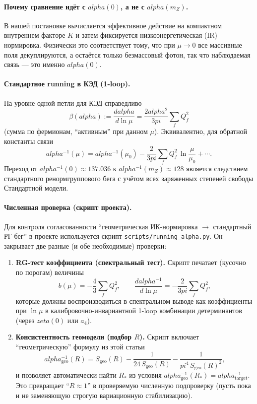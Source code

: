 \documentclass[12pt]{article}
\def\alpha{alpha}%
\def\pi{pi}%
\def\zeta{zeta}%
\begin{document}
\paragraph{Почему сравнение идёт с $\alpha(0)$, а не с $\alpha(m_Z)$.}
В нашей постановке вычисляется эффективное действие на компактном внутреннем факторе $K$ и затем фиксируется низкоэнергетическая (IR) нормировка.
Физически это соответствует тому, что при $\mu\to 0$ все массивные поля декуплируются, а остаётся только безмассовый фотон, так что наблюдаемая связь --- это именно $\alpha(0)$.

\paragraph{Стандартное running в КЭД (1-loop).}
На уровне одной петли для КЭД справедливо
\begin{equation}
\beta(\alpha):=\frac{d\alpha}{d\ln\mu}=\frac{2\alpha^2}{3\pi}\sum_f Q_f^2
\end{equation}
(сумма по фермионам, ``активным'' при данном $\mu$).
Эквивалентно, для обратной константы связи
\begin{equation}
\alpha^{-1}(\mu)=\alpha^{-1}(\mu_0)-\frac{2}{3\pi}\sum_f Q_f^2\,\ln\frac{\mu}{\mu_0}+\cdots.
\end{equation}
Переход от $\alpha^{-1}(0)\approx 137.036$ к $\alpha^{-1}(m_Z)\approx 128$ является следствием стандартного ренормгруппового бега с учётом всех заряженных степеней свободы Стандартной модели.

\paragraph{Численная проверка (скрипт проекта).}
Для контроля согласованности ``геометрическая ИК-нормировка $\to$ стандартный РГ-бег'' в проекте используется скрипт \texttt{scripts/running\_alpha.py}.
Он закрывает две разные (и обе необходимые) проверки:
\begin{enumerate}
  \item \textbf{RG-тест коэффициента (спектральный тест).}
  Скрипт печатает (кусочно по порогам) величины
  \begin{equation}
  b(\mu)= -\frac{4}{3}\sum_f Q_f^2,\qquad
  \frac{d\alpha^{-1}}{d\ln\mu}= -\frac{2}{3\pi}\sum_f Q_f^2,
  \end{equation}
  которые должны воспроизводиться в спектральном выводе как коэффициенты при $\ln\mu$ в калибровочно-инвариантной 1-loop комбинации детерминантов (через $\zeta(0)$ или $a_4$).

  \item \textbf{Консистентность геомодели (подбор $R$).}
  Скрипт включает ``геометрическую'' формулу из этой статьи
  \begin{equation}
  \alpha^{-1}_{\mathrm{geo}}(R)=S_{\mathrm{geo}}(R)-\frac{1}{24\,S_{\mathrm{geo}}(R)}-\frac{1}{\pi^4\,S_{\mathrm{geo}}(R)^2},
  \end{equation}
  и позволяет автоматически найти $R_\ast$ из условия $\alpha^{-1}_{\mathrm{geo}}(R_\ast)=\alpha^{-1}_{\mathrm{target}}$.
  Это превращает ``$R\approx1$'' в проверяемую численную подпроверку (пусть пока и не заменяющую строгую вариационную стабилизацию).
\end{enumerate}
\end{document}
